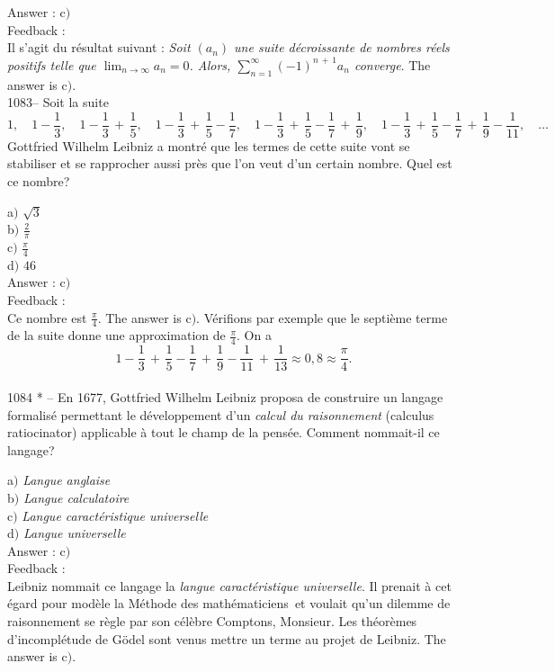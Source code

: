 ﻿\documentclass[letterpaper, 12pt]{article}
\begin{document}
Answer : c$)$\\

Feedback : \\
Il s'agit du r\'esultat suivant : {\sl Soit $(a_n)$ une suite
d\'ecroissante de nombres r\'eels positifs telle que
$\lim_{n\to\infty}a_n=0$. Alors,
$\sum_{n=1}^{\infty}(-1)^{n\,+\,1}a_n$ converge}.
The answer is c$)$.\\

1083-- Soit la suite
$$\displaystyle{1,\quad1-\frac13,\quad1-\frac13\,+\,\frac15,\quad1-\frac13\,+\,\frac15-\frac17,\quad1-\frac13\,+\,\frac15-\frac17\,+\,\frac19,\quad
1-\frac13\,+\,\frac15-\frac17\,+\,\frac19-\frac1{11},\quad\ldots}$$
Gottfried Wilhelm Leibniz a montr\'e que les termes de cette suite
vont se stabiliser et se rapprocher aussi pr\`es que l'on veut d'un
certain nombre. Quel est ce nombre?

a$)$ $\sqrt3$ \\ [2mm] b$)$ $\frac2{\pi}$ \\ [2mm] c$)$
$\frac{\pi}4$ \\ [2mm]
d$)$ $46$\\

Answer : c$)$\\

Feedback : \\
Ce nombre est $\frac{\pi}4$. The answer is c$)$. V\'erifions par
exemple que le septi\`eme terme de la suite donne une approximation
de $\frac{\pi}4$. On a
$$1-\frac13\,+\,\frac15-\frac17\,+\,\frac19-\frac1{11}\,+\,\frac1{13}\approx0,8\approx\frac{\pi}4.$$
\\

1084 * -- En 1677, Gottfried Wilhelm Leibniz proposa de construire
un langage formalis\'e permettant le d\'eveloppement d'un {\sl
calcul du raisonnement} (\og calculus ratiocinator\fg) applicable
\`a tout le champ de la pens\'ee. Comment nommait-il ce langage?

a$)$ {\sl Langue anglaise} \\
b$)$ {\sl Langue calculatoire} \\
c$)$ {\sl Langue caract\'eristique universelle} \\
d$)$ {\sl Langue universelle}\\

Answer : c$)$\\

Feedback :\\
Leibniz nommait ce langage la {\sl langue caract\'eristique
universelle}. Il prenait \`a cet \'egard pour mod\`ele la \og
M\'ethode des math\'ematiciens\fg\ et voulait qu'un dilemme de
raisonnement se r\`egle par son c\'el\`ebre \og Comptons,
Monsieur\fg . Les th\'eor\`emes d'incompl\'etude de G\"odel sont
venus mettre un terme au projet de Leibniz.
The answer is c$)$.\\
\end{document}
